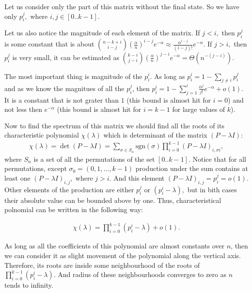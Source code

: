 \documentclass{article}
\begin{document}
Let us consider only the part of this matrix without the final state. So we have only $p_i^j,$ where $i, j \in [0..k-1].$

Let us also notice the magnitude of each element of the matrix. If $j < i,$ then $p_i^j$ is some constant that is about $\binom{n - k + i}{i - j}\left(\frac{\alpha}{n}\right)^{i - j}e^{-\alpha} \approx \frac{\alpha^{i - j}}{(i - j)!} e^{-\alpha}.$ If $j > i,$ then $p_i^j$ is very small, it can be estimated as $\binom{k - i}{j - i}\left(\frac{\alpha}{n}\right)^{j - i}e^{-\alpha} = \Theta(n^{-(j - i)}).$

The most important thing is magnitude of the $p_i^i.$ As long as $p_i^i = 1 - \sum\limits_{j \ne i} p_i^j$ and as we know the magnitues of all the $p_i^j$, then $p_i^i = 1 - \sum\limits_{j = 1}^{i} \frac{\alpha^j}{j!}e^{-\alpha} + o(1).$  It is a constant that is not grater than $1$ (this bound is almost hit for $i = 0$) and not less then $e^{-\alpha}$ (this bound is almost hit for $i = k - 1$ for large values of $k$).

Now to find the spectrum of this matrix we should find all the roots of its characteristic polynomial $\chi(\lambda)$ which is determinant of the matrix $(P - \lambda I):$
\begin{align*}
  \chi(\lambda) = \det (P - \lambda I) = \sum\limits_{\sigma \in S_n} \text{sgn}(\sigma) \prod\limits_{i = 0}^{k - 1}(P - \lambda I)_{i, \sigma{i}},
\end{align*}
where $S_n$ is a set of all the permutations of the set $[0..k - 1].$ Notice that for all permutations, except $\sigma_0 = (0, 1, \dots, k - 1)$ production under the sum contains at least one $(P - \lambda I)_{i, j},$ where $j > i$. And this element $(P - \lambda I)_{i, j} = p_i^j = o(1)$. Other elements of the production are either $p_i^j$ or $(p_i^i - \lambda),$ but in bith cases their absolute value can be bounded above by one. Thus, characteristical polnomial can be written in the following way:

\begin{align*}
  \chi(\lambda) = \prod\limits_{i = 0}^{k - 1} (p_i^i - \lambda) + o(1).
\end{align*}

As long as all the coefficients of this polynomial are almost constants over $n$, then we can consider it as slight movement of the polynomial along the vertical axis. Therefore, its roots are inside some neighbourhood of the roots of $\prod\limits_{i = 0}^{k - 1} (p_i^i - \lambda).$ And radius of these neighbourhoods converges to zero as $n$ tends to infinity.
\end{document}
